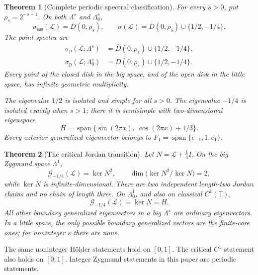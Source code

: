 \documentclass[11pt,a4paper]{article}
\numberwithin{equation}{section}
\newtheorem{theorem}{Theorem}[section]
\theoremstyle{definition}
\theoremstyle{remark}
\newcommand{\T}{\mathbb T}
\newcommand{\Ll}{\mathcal L}
\newcommand{\ess}{\mathrm{ess}}
\newcommand{\pt}{\mathrm p}
\newcommand{\Span}{\operatorname{span}}
\newcommand{\disk}[1]{\overline{D}(0,#1)}
\newcommand{\openD}[1]{D(0,#1)}
\newcommand{\Gg}[2]{\mathcal G_{#1}(#2)}
\newcommand{\smallspace}{\Lambda_0}
\begin{document}
\begin{theorem}[Complete periodic spectral classification]
\label{thm:sine-main}
For every $s>0$, put $\rho_s=2^{-s-1}$. On both $\Lambda^s$ and
$\smallspace^s$,
\begin{equation}
 \sigma_{\ess}(\Ll)=\disk{\rho_s},\qquad
 \sigma(\Ll)=\disk{\rho_s}\cup\{1/2,-1/4\}.
 \label{eq:sine-spectrum}
\end{equation}
The point spectra are
\begin{align}
 \sigma_{\pt}(\Ll;\Lambda^s)
 &=\disk{\rho_s}\cup\{1/2,-1/4\},\label{eq:big-point}\\
 \sigma_{\pt}(\Ll;\smallspace^s)
 &=\openD{\rho_s}\cup\{1/2,-1/4\}.
 \label{eq:little-point}
\end{align}
Every point of the closed disk in the big space, and of the open disk in
the little space, has infinite geometric multiplicity.

The eigenvalue $1/2$ is isolated and simple for all $s>0$.
The eigenvalue $-1/4$ is isolated exactly when $s>1$; there it is
semisimple with two-dimensional eigenspace
\begin{equation}
 H=\Span\{\sin(2\pi x),\ \cos(2\pi x)+1/3\}.
 \label{eq:H}
\end{equation}
Every exterior generalized eigenvector belongs to
$F_1=\Span\{e_{-1},1,e_1\}$.
\end{theorem}

\begin{theorem}[The critical Jordan transition]
\label{thm:sine-jordan}
Let $N=\Ll+\tfrac14 I$.
On the big Zygmund space $\Lambda^1$,
\begin{equation}
 \Gg{-1/4}{\Ll}=\ker N^2,\qquad
 \dim\bigl(\ker N^2/\ker N\bigr)=2,
 \label{eq:critical-big}
\end{equation}
while $\ker N$ is infinite-dimensional. There are two independent
length-two Jordan chains and no chain of length three.
On $\smallspace^1$, and also on classical $C^1(\T)$,
\begin{equation}
 \Gg{-1/4}{\Ll}=\ker N=H.
 \label{eq:critical-little}
\end{equation}
All other boundary generalized eigenvectors in a big $\Lambda^s$ are
ordinary eigenvectors. In a little space, the only possible boundary
generalized vectors are the finite-core ones; for noninteger $s$ there
are none.
\end{theorem}

The same noninteger H\"older statements hold on $[0,1]$. The critical
$C^1$ statement also holds on $[0,1]$. Integer Zygmund statements in this
paper are periodic statements.
\end{document}
